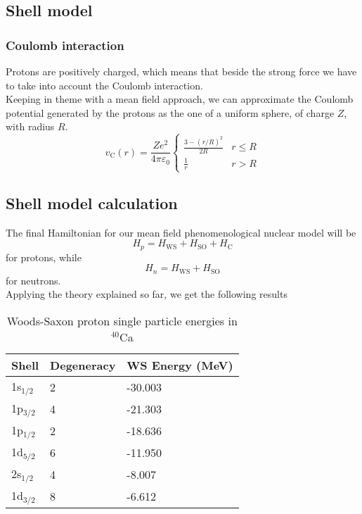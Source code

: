 \subsection{Shell model}
\subsubsection{Coulomb interaction}
Protons are positively charged, which means that beside the strong force we have to take into account the Coulomb interaction.
\\Keeping in theme with a mean field approach, we can approximate the Coulomb potential generated by the protons as the one of a uniform sphere, of charge $Z$, with radius $R$.
\begin{equation}
    v_{\text{C}}(r) = \frac{Ze^2}{4\pi\varepsilon_0} 
    \begin{cases}
        \frac{3-(r/R)^2}{2R} & r \le R \\
        \frac 1 r & r > R
    \end{cases}
\end{equation}
\subsection{Shell model calculation}
The final Hamiltonian for our mean field phenomenological nuclear model will be
\begin{equation}
    H_p = H_\text{WS} + H_\text{SO} + H_\text{C}
\end{equation}
for protons, while
\begin{equation}
    H_n = H_\text{WS} + H_\text{SO} 
\end{equation}
for neutrons.
\\Applying the theory explained so far, we get the following results

\begin{table}
   
\centering
\caption{Woods-Saxon proton single particle energies in $^\text{40}$Ca}
\begin{tabular}{@{}lll@{}}
\toprule
Shell         & Degeneracy & WS Energy (MeV) \\ \midrule
1s$_{1/2}$    & 2          & -30.003         \\
1p$_{3/2}$    & 4          & -21.303         \\
1p$_{1/2}$    & 2          & -18.636         \\
1d$_{5/2}$    & 6          & -11.950         \\
2s$_{1/2}$    & 4          & -8.007          \\
1d$_{3/2}$    & 8          & -6.612          \\
\bottomrule
\end{tabular}
\end{table}

